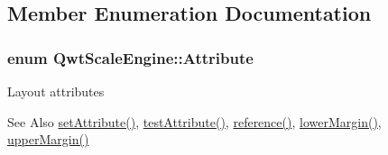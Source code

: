 \subsection{Member Enumeration Documentation}
\hypertarget{class_qwt_scale_engine_a7548418e0896d75eec164bfa2ba3ff5f}{
\subsubsection[{Attribute}]{\setlength{\rightskip}{0pt plus 5cm}enum {\bf Qwt\-Scale\-Engine\-::\-Attribute}}}\label{class_qwt_scale_engine_a7548418e0896d75eec164bfa2ba3ff5f}
Layout attributes \begin{DoxySeeAlso}{See Also}
\hyperlink{class_qwt_scale_engine_acf02a88f6e778edbc9e005960f35b3b7}{set\-Attribute()}, \hyperlink{class_qwt_scale_engine_ab43cac5ff8843531bbb02b4401e8fb62}{test\-Attribute()}, \hyperlink{class_qwt_scale_engine_a5962458870865df797e84e3bd6badf02}{reference()}, \hyperlink{class_qwt_scale_engine_a0cbcd5c35a8796baf8307bba19991bab}{lower\-Margin()}, \hyperlink{class_qwt_scale_engine_aa3fca2f37156fa3bd8ef21be8d339938}{upper\-Margin()} 
\end{DoxySeeAlso}

